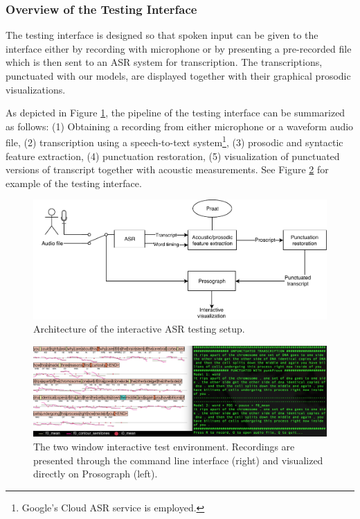 \subsubsection{Overview of the Testing Interface}

The testing interface is designed so that spoken input can be given to the interface either by recording with microphone or by presenting a pre-recorded file which is then sent to an ASR system for transcription. The transcriptions, punctuated with our models, are displayed together with their graphical prosodic visualizations. 

As depicted in Figure \ref{punkProse:figure:testing_system}, the pipeline of the testing interface can be summarized as follows: (1) Obtaining a recording from either microphone or a waveform audio file, (2) transcription using a speech-to-text system\footnote{Google's Cloud ASR service is employed.}, (3) prosodic and syntactic feature extraction, (4) punctuation restoration, (5) visualization of punctuated versions of transcript together with acoustic measurements. See Figure \ref{punkProse:testing_interface} for example of the testing interface. 

\begin{figure}
\begin{center}
\includegraphics[width=1.0\textwidth]{img/punkProse_setup.pdf}
\caption{Architecture of the interactive ASR testing setup.}
\label{punkProse:figure:testing_system}
\end{center}
\end{figure}

\begin{figure}
\begin{center}
\includegraphics[width=1.0\textwidth]{img/interface-5.png}
\caption{The two window interactive test environment. Recordings are presented through the command line interface (right) and visualized directly on Prosograph (left).}
\label{punkProse:testing_interface}
\end{center}
\end{figure}

